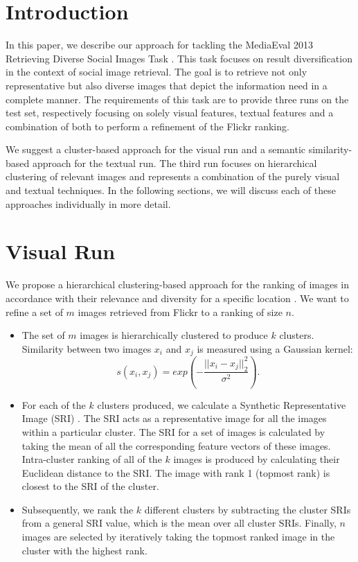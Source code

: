 \documentclass{acm_proc_article-me11_tweaked}
\begin{document}
\section{Introduction}
In this paper, we describe our approach for tackling the MediaEval 2013 Retrieving Diverse Social Images Task \cite{mediaeval-diversephotos}.
This task focuses on result diversification in the context of social image retrieval. 
The goal is to retrieve not only representative but also diverse images that depict the information need in a complete manner.
The requirements of this task are to provide three runs on the test set, respectively focusing on solely visual features, textual features and a combination of both to perform a refinement of the Flickr ranking.

We suggest a cluster-based approach for the visual run and a semantic similarity-based approach for the textual run.
The third run focuses on hierarchical clustering of relevant images and represents a combination of the purely visual and textual techniques.
In the following sections, we will discuss each of these approaches individually in more detail.

\section{Visual Run}
\label{visual-similarity}
We propose a hierarchical clustering-based approach for the ranking of images in accordance with their relevance and diversity for a specific location \cite{representativeness}. 
We want to refine a set of $m$ images retrieved from Flickr to a ranking of size $n$.
\begin{itemize}
 \item The set of $m$ images is hierarchically clustered to produce $k$ clusters. Similarity between two images $x_i$ and $x_j$ is measured using a Gaussian kernel:
 \begin{equation}
 \label{gaussian-similarity}
s(x_i, x_j) = exp\left(-\frac{||x_i - x_j||_2^2}{\sigma^2}\right).
 \end{equation}
 \item For each of the $k$ clusters produced, we calculate a Synthetic Representative Image (SRI) \cite{representativeness}.
The SRI acts as a representative image for all the images within a particular cluster. 
The SRI for a set of images is calculated by taking the mean of all the corresponding feature vectors of these images. 
Intra-cluster ranking of all of the $k$ images is produced by calculating their Euclidean distance to the SRI.
The image with rank 1 (topmost rank) is closest to the SRI of the cluster.
\item Subsequently, we rank the $k$ different clusters by subtracting the cluster SRIs from a general SRI value, which is the mean over all cluster SRIs. 
Finally, $n$ images are selected by iteratively taking the topmost ranked image in the cluster with the highest rank. 
\end{itemize}
\end{document}
